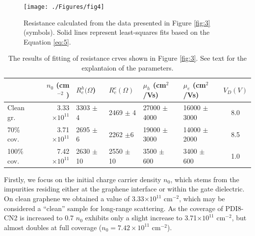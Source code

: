 \documentclass[review]{elsarticle}
\begin{document}
\begin{figure}[htb]
  \centering
   \texttt{[image: ./Figures/fig4]}  
  \caption{Resistance calculated from the data presented in Figure {\ref{fig:3}} (symbols).
 Solid lines represent least-squares fits based on the Equation \ref{eq:5}.
}
  \label{fig:4}
\end{figure}

\noindent \begin{table}[h]
  \centering
  \begin{tabular}{|l|r|l|l|l|l|c|} \hline%
   & $n_{0}$ (cm$^{-2}$ )& $R_{c}^{h}(\Omega$) & $R_{c}^{e}(\Omega)$ & $\mu_{h}$ (cm$^{2}$/Vs) & $\mu_{e}$ (cm$^{2}$/Vs) & $V_{D}(V) $  \\ \hline%
    Clean gr.
 & 3.33$\times 10^{11}$ & 3303 $\pm$ 4 & 2469 $\pm$ 4 & 27000 $\pm$ 4000 & 16000 $\pm$ 3000 & 8.0 \\
    70\% cov.
 &3.71$\times 10^{11}$ & 2695 $\pm$ 6 & 2262 $\pm$6 & 19000 $\pm$ 3000 & 14000 $\pm $2000 & 8.5 \\
     100\% cov.
 &7.42$\times 10^{11}$ & 2630 $\pm$ 10 & 2550 $\pm$10 & 3500 $\pm$ 600 & 3400 $\pm$ 600 & 1.0 \\ \hline
    
  \end{tabular}
  \caption{The results of fitting of resistance crves shown in Figure \ref{fig:3}.
 See  text for the explantaion of the parameters.
}
  \label{tab:1}
\end{table}


Firstly, we focus on the initial charge carrier density $n_0$, which stems from the impurities residing either at the graphene interface or within the gate dielectric.
 On clean graphene we obtained a value of 3.33$\times 10^{11}$ cm$^{-2}$, which may be considered a ``clean'' sample for long-range scattering.
  As the coverage of PDI8-CN2 is increased to 0.7 $n_0$ exhibits only a slight increase to 3.71$\times 10^{11}$ cm$^{-2}$, but almost doubles at full coverage ($n_{0}=7.42\times 10^{11}$ cm$^{-2}$).
\end{document}
